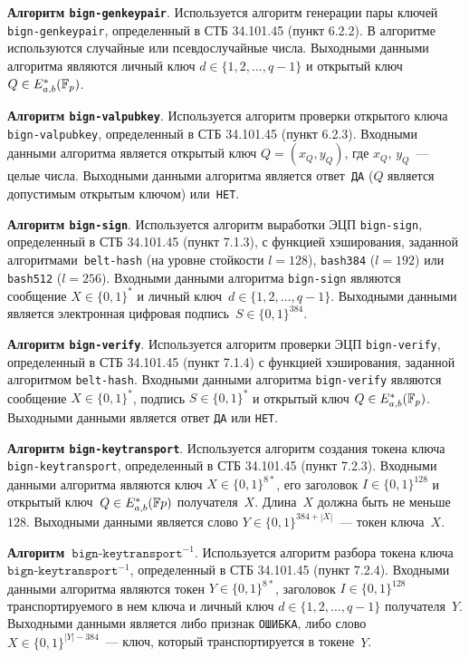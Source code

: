 {\bf Алгоритм \texttt{bign-genkeypair}}.
Используется алгоритм генерации пары ключей 
\texttt{bign-genkeypair}, определенный в СТБ 34.101.45 (пункт 6.2.2).
В алгоритме используются случайные или псевдослучайные числа. Выходными данными 
алгоритма являются личный ключ $d \in\{1,2,\ldots,q-1\}$ и открытый 
ключ~$Q\in E_{a,b}^*({\mathbb F}_p)$.

{\bf Алгоритм \texttt{bign-valpubkey}}.
Используется алгоритм проверки открытого ключа 
\texttt{bign-valpubkey}, определенный в СТБ 34.101.45 (пункт 6.2.3). Входными 
данными алгоритма является открытый ключ $Q = (x_Q, y_Q)$, 
где $x_Q$, $y_Q$~--- целые числа. Выходными данными алгоритма является 
ответ~\texttt{ДА} ($Q$ является допустимым открытым ключом) или~\texttt{НЕТ}.

{\bf Алгоритм \texttt{bign-sign}}. Используется алгоритм выработки ЭЦП 
\texttt{bign-sign}, определенный в СТБ 34.101.45 (пункт 7.1.3), с функцией 
хэширования, заданной алгоритмами~\texttt{belt-hash} (на уровне стойкости $l=128$),
\texttt{bash384} ($l=192$) или \texttt{bash512} ($l=256$).
Входными данными алгоритма \texttt{bign-sign} являются сообщение 
$X\in\{0,1\}^*$ и личный ключ~$d\in\{1,2,\ldots,q-1\}$.
Выходными данными является электронная цифровая подпись~$S\in\{0,1\}^{384}$.

{\bf Алгоритм \texttt{bign-verify}}.
Используется алгоритм проверки ЭЦП \texttt{bign-verify}, 
определенный в СТБ 34.101.45 (пункт 7.1.4) с функцией хэширования, 
заданной алгоритмом \texttt{belt-hash}. Входными данными алгоритма 
\texttt{bign-verify} являются сообщение $X\in\{0,1\}^*$, 
подпись $S\in\{0,1\}^*$ и открытый ключ $Q \in E_{a,b}^*({\mathbb F}_p)$.
Выходными данными является ответ \texttt{ДА} или \texttt{НЕТ}.

{\bf Алгоритм \texttt{bign-keytransport}}.
Используется алгоритм создания токена ключа 
\texttt{bign-keytransport}, определенный в СТБ 34.101.45 (пункт 7.2.3).
Входными данными алгоритма являются ключ $X\in\{0,1\}^{8*}$, 
его заголовок $I\in\{0,1\}^{128}$ и открытый ключ~$Q\in E_{a,b}^*({\mathbb F} p)$ 
получателя~$X$. Длина~$X$ должна быть не меньше~$128$.
Выходными данными является слово $Y\in\{0,1\}^{384+|X|}$~--- токен ключа~$X$.
 
{\bf Алгоритм~$\texttt{bign-keytransport}^{-1}$}.
Используется алгоритм разбора токена ключа~$\texttt{bign-keytransport}^{-1}$, 
определенный в СТБ 34.101.45 (пункт 7.2.4). Входными 
данными алгоритма являются токен $Y\in\{0,1\}^{8*}$, 
заголовок $I\in\{0,1\}^{128}$ транспортируемого в нем ключа 
и личный ключ $d\in\{1,2,\ldots,q-1\}$ получателя~$Y$.
Выходными данными является либо признак \texttt{ОШИБКА}, 
либо слово~$X\in\{0,1\}^{|Y|-384}$~--- ключ, 
который транспортируется в токене~$Y$.

